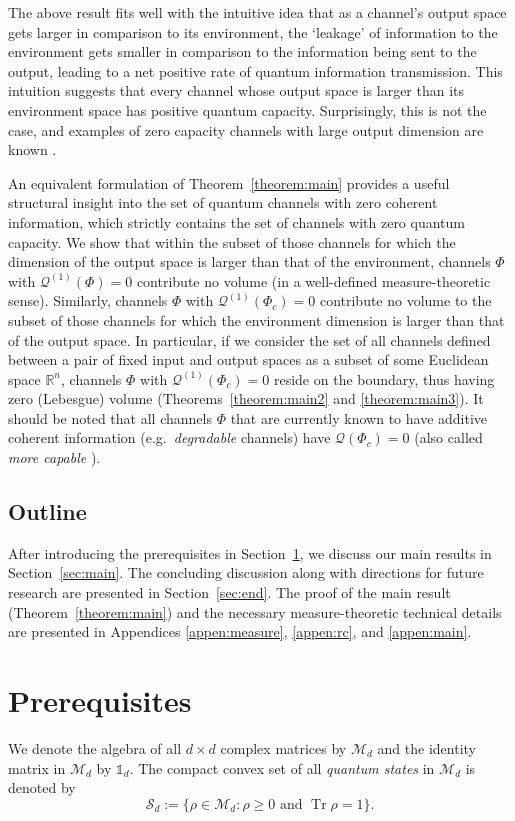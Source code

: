 \documentclass[a4paper,onecolumn,10pt,accepted=2022-07-11]{quantumarticle}
\newcommand{\M}[1]{\mathcal{M}_{#1}}
\theoremstyle{definition}
\newcommand{\iden}{\mathbb{1}}
\begin{document}
The above result fits well with the intuitive idea that as a channel's output space gets larger in comparison to its environment, the `leakage' of information to the environment gets smaller in comparison to the information being sent to the output, leading to a net positive rate of quantum information transmission. This intuition suggests that every channel whose output space is larger than its environment space has positive quantum capacity. Surprisingly, this is not the case, and examples of zero capacity channels with large output dimension are known \cite{Cubitt2008degradable}.

An equivalent formulation of Theorem~\ref{theorem:main} provides a useful structural insight into the set of quantum channels with zero coherent information, which strictly contains the set of channels with zero quantum capacity. We show that within the subset of those channels for which the dimension of the output space is larger than that of the environment, channels $\Phi$ with $\mathcal{Q}^{(1)}(\Phi)=0$ contribute no volume (in a well-defined measure-theoretic sense). Similarly, channels $\Phi$ with $\mathcal{Q}^{(1)}(\Phi_c)=0$ contribute no volume to the subset of those channels for which the environment dimension is larger than that of the output space. In particular, if we consider the set of all channels defined between a pair of fixed input and output spaces as a subset of some Euclidean space $\mathbb{R}^n$, channels $\Phi$ with $\mathcal{Q}^{(1)}(\Phi_c)=0$ reside on the boundary, thus having zero (Lebesgue) volume (Theorems~\ref{theorem:main2} and \ref{theorem:main3}). It should be noted that all channels $\Phi$ that are currently known to have additive coherent information (e.g.~\emph{degradable} channels) have $\mathcal{Q}(\Phi_c)=0$ (also called \emph{more capable} \cite{Watanabe2012capable}).

\subsection{Outline} After introducing the prerequisites in Section~\ref{sec:prereq}, we discuss our main results in Section~\ref{sec:main}. The concluding discussion along with directions for future research are presented in Section~\ref{sec:end}. The proof of the main result (Theorem~\ref{theorem:main}) and the necessary measure-theoretic technical details are presented in Appendices \ref{appen:measure}, \ref{appen:rc}, and \ref{appen:main}.


\section{Prerequisites} \label{sec:prereq}
We denote the algebra of all $d\times d$ complex matrices by $\M{d}$ and the identity matrix in $\M{d}$ by $\iden_d$. The compact convex set of all \emph{quantum states} in $\M{d}$ is denoted by 
\begin{equation}
    \mathcal{S}_d:=\{\rho\in\M{d}: \rho\geq 0\text{ and } \operatorname{Tr}\rho = 1 \}.
\end{equation}
\end{document}
